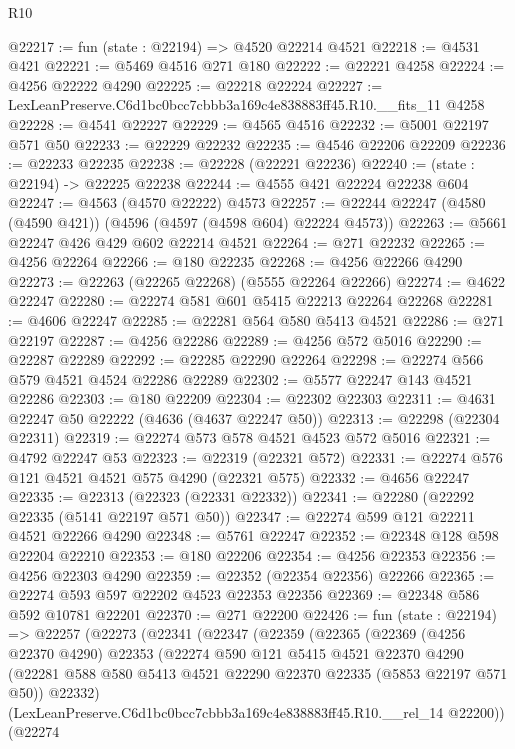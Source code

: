 \begin{lexlean}{R10}
\begin{coremodule}
@22217 := fun (state : @22194) => @4520 @22214 @4521
@22218 := @4531 @421
@22221 := @5469 @4516 @271 @180
@22222 := @22221 @4258
@22224 := @4256 @22222 @4290
@22225 := @22218 @22224
@22227 := LexLeanPreserve.C6d1bc0bcc7cbbb3a169c4e838883ff45.R10.__fits_11 @4258
@22228 := @4541 @22227
@22229 := @4565 @4516
@22232 := @5001 @22197 @571 @50
@22233 := @22229 @22232
@22235 := @4546 @22206 @22209
@22236 := @22233 @22235
@22238 := @22228 (@22221 @22236)
@22240 := (state : @22194) -> @22225 @22238
@22244 := @4555 @421 @22224 @22238 @604
@22247 := @4563 (@4570 @22222) @4573
@22257 := @22244 @22247 (@4580 (@4590 @421)) (@4596 (@4597 (@4598 @604) @22224 @4573))
@22263 := @5661 @22247 @426 @429 @602 @22214 @4521
@22264 := @271 @22232
@22265 := @4256 @22264
@22266 := @180 @22235
@22268 := @4256 @22266 @4290
@22273 := @22263 (@22265 @22268) (@5555 @22264 @22266)
@22274 := @4622 @22247
@22280 := @22274 @581 @601 @5415 @22213 @22264 @22268
@22281 := @4606 @22247
@22285 := @22281 @564 @580 @5413 @4521
@22286 := @271 @22197
@22287 := @4256 @22286
@22289 := @4256 @572 @5016
@22290 := @22287 @22289
@22292 := @22285 @22290 @22264
@22298 := @22274 @566 @579 @4521 @4524 @22286 @22289
@22302 := @5577 @22247 @143 @4521 @22286
@22303 := @180 @22209
@22304 := @22302 @22303
@22311 := @4631 @22247 @50 @22222 (@4636 (@4637 @22247 @50))
@22313 := @22298 (@22304 @22311)
@22319 := @22274 @573 @578 @4521 @4523 @572 @5016
@22321 := @4792 @22247 @53
@22323 := @22319 (@22321 @572)
@22331 := @22274 @576 @121 @4521 @4521 @575 @4290 (@22321 @575)
@22332 := @4656 @22247
@22335 := @22313 (@22323 (@22331 @22332))
@22341 := @22280 (@22292 @22335 (@5141 @22197 @571 @50))
@22347 := @22274 @599 @121 @22211 @4521 @22266 @4290
@22348 := @5761 @22247
@22352 := @22348 @128 @598 @22204 @22210
@22353 := @180 @22206
@22354 := @4256 @22353
@22356 := @4256 @22303 @4290
@22359 := @22352 (@22354 @22356) @22266
@22365 := @22274 @593 @597 @22202 @4523 @22353 @22356
@22369 := @22348 @586 @592 @10781 @22201
@22370 := @271 @22200
@22426 := fun (state : @22194) =>
  @22257
    (@22273
      (@22341
        (@22347
          (@22359
            (@22365
              (@22369
                (@4256 @22370 @4290)
                @22353
                (@22274
                  @590
                  @121
                  @5415
                  @4521
                  @22370
                  @4290
                  (@22281 @588 @580 @5413 @4521 @22290 @22370 @22335 (@5853 @22197 @571 @50))
                  @22332)
                (LexLeanPreserve.C6d1bc0bcc7cbbb3a169c4e838883ff45.R10.__rel_14 @22200))
              (@22274

\end{coremodule}
\end{lexlean}
